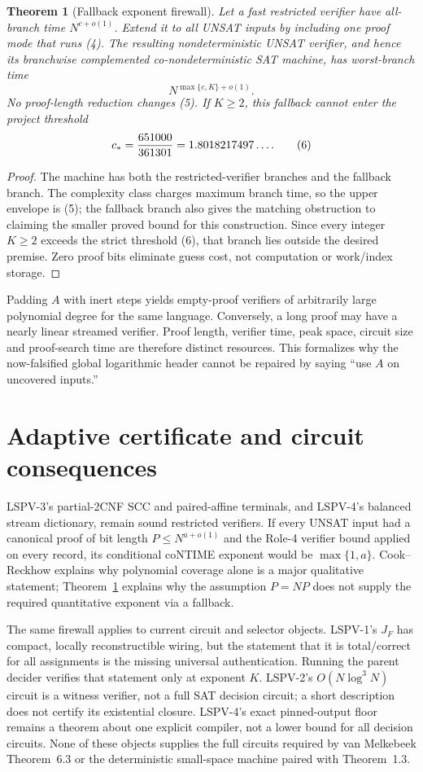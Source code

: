 \documentclass[11pt]{article}
\newtheorem{theorem}{Theorem}
\begin{document}
\begin{theorem}[Fallback exponent firewall]\label{th:fallback}
Let a fast restricted verifier have all-branch time
$N^{c+o(1)}$.  Extend it to all UNSAT inputs by including one proof mode that
runs (4).  The resulting nondeterministic UNSAT verifier, and hence its
branchwise complemented co-nondeterministic SAT machine, has worst-branch
time
\[
                         N^{\max\{c,K\}+o(1)}.                  \tag{5}
\]
No proof-length reduction changes (5).  If $K\ge2$, this fallback cannot
enter the project threshold
\[
 c_*={651000\over361301}=1.8018217497\ldots.                   \tag{6}
\]
\end{theorem}
\begin{proof}
The machine has both the restricted-verifier branches and the fallback
branch.  The complexity class charges maximum branch time, so the upper
envelope is (5); the fallback branch also gives the matching obstruction to
claiming the smaller proved bound for this construction.  Since every
integer $K\ge2$ exceeds the strict threshold (6), that branch lies outside
the desired premise.  Zero proof bits eliminate guess cost, not computation
or work/index storage.
\end{proof}

Padding $A$ with inert steps yields empty-proof verifiers of arbitrarily
large polynomial degree for the same language.  Conversely, a long proof
may have a nearly linear streamed verifier.  Proof length, verifier time,
peak space, circuit size and proof-search time are therefore distinct
resources.  This formalizes why the now-falsified global logarithmic header
cannot be repaired by saying ``use $A$ on uncovered inputs.''

\section{Adaptive certificate and circuit consequences}
LSPV-3's partial-2CNF SCC and paired-affine terminals, and LSPV-4's balanced
stream dictionary, remain sound restricted verifiers.  If every UNSAT input
had a canonical proof of bit length $P\le N^{a+o(1)}$ and the Role-4 verifier
bound applied on every record, its conditional coNTIME exponent would be
$\max\{1,a\}$.  Cook--Reckhow explains why polynomial coverage alone is a
major qualitative statement; Theorem~\ref{th:fallback} explains why the
assumption $P=NP$ does not supply the required quantitative exponent via a
fallback.

The same firewall applies to current circuit and selector objects.
LSPV-1's $J_F$ has compact, locally reconstructible wiring, but the statement
that it is total/correct for all assignments is the missing universal
authentication.  Running the parent decider verifies that statement only at
exponent $K$.  LSPV-2's $O(N\log^3N)$ circuit is a witness verifier, not a
full SAT decision circuit; a short description does not certify its
existential closure.  LSPV-4's exact pinned-output floor remains a theorem
about one explicit compiler, not a lower bound for all decision circuits.
None of these objects supplies the full circuits required by van Melkebeek
Theorem~6.3 or the deterministic small-space machine paired with
Theorem~1.3.
\end{document}
